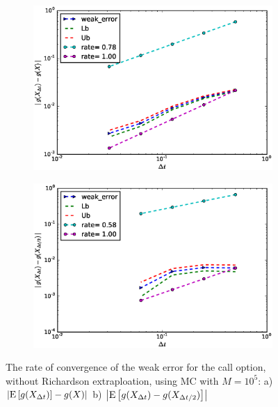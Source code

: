 \documentclass[11pt]{article}
\newcommand{\expt}[1]{\mathrm{E}\left[#1\right]}
\begin{document}
\begin{figure}[h!]
	\centering
	\begin{subfigure}{.4\textwidth}
		\centering
		\includegraphics[width=1\linewidth]{./figures/weak_error_rates_call/Beta_32/without_rich/weak_convergence_order_call_option_relative_M_10_5}
		\caption{}
		\label{fig:sub3}
	\end{subfigure}%
	\begin{subfigure}{.4\textwidth}
		\centering
		\includegraphics[width=1\linewidth]{./figures/weak_error_rates_call/Beta_32/without_rich/weak_convergence_order_differences_call_option_relative_M_10_5}
		\caption{}
		\label{fig:sub4}
	\end{subfigure}
	
	\caption{The rate of convergence of the weak error for the call option, without Richardson extraploation, using MC with $M=10^5$: a) $\abs{\expt{g(X_{\Delta t})}-g(X)}$  b) $\abs{\expt{g(X_{\Delta t})-g(X_{\Delta t/2})}}$ }
	\label{fig:Weak_rate_call_without_rich_beta_32}
\end{figure}
\end{document}
